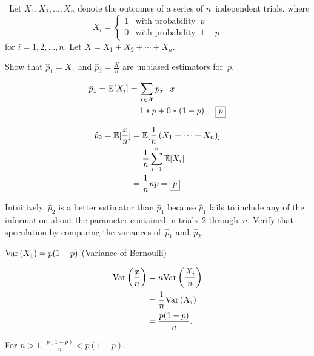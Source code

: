 \begin{problem}
  ~Let ${X_1,X_2,\ldots,X_n}$  denote the outcomes of a series of $n$~independent trials, where
  \begin{equation*}
    X_i =   \begin{cases}
              1 & \text{with probability }~p \\
              0 & \text{with probability }~1 - p
            \end{cases}
  \end{equation*}
  \noindent
  for ${i=1,2,\ldots,n}$. Let ${X = X_1 + X_2 + \cdots + X_n}$.
\end{problem}

\begin{subproblem}
  Show that $\hat{p}_1 = X_1$ and ${\hat{p}_2 = \frac{X}{n}}$ are unbiased estimators for~$p$.
\end{subproblem}

\begin{align*}
  \hat{p}_1 = \mathbb{E}\lbrack X_i\rbrack &= \sum_{x \in \mathcal{X}} p_x \cdot x \\
                            &= 1 * p + 0 * (1 - p) =\boxed{p}
\end{align*}

\begin{align*}
  \hat{p}_2 = \mathbb{E}\lbrack\frac{\bar{x}}{n}\rbrack &= \mathbb{E}\lbrack\frac{1}{n} \left(X_1 + \cdots + X_n\right)\rbrack \\
                                          &= \frac{1}{n} \sum_{i=1}^{n} \mathbb{E}\lbrack X_i\rbrack \\
                                          &= \frac{1}{n} np = \boxed{p}
\end{align*}

\begin{subproblem}
  Intuitively, $\hat{p}_2$ is a better estimator than $\hat{p}_1$ because $\hat{p}_1$ fails to include any of the information about the parameter contained in trials~2 through~$n$. Verify that speculation by comparing the variances of~$\hat{p}_1$ and~$\hat{p}_2$.
\end{subproblem}

$\text{Var}\left(X_1\right) = p(1-p)$ (Variance of Bernoulli)

\begin{align}
  \text{Var}\left(\frac{\bar{x}}{n}\right) &= n \text{Var}\left(\frac{X_i}{n}\right) \\
                          &= \frac{1}{n} \text{Var}\left(X_i\right) \\
                          &= \frac{p(1-p)}{n} \text{.}
\end{align}

For ${n > 1}$, ${\frac{p(1-p)}{n} < p(1-p)}$.
